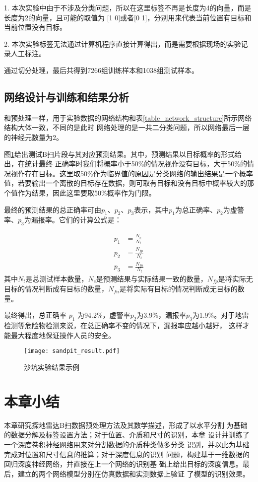 1. 本次实验中由于不涉及分类问题，所以在这里标签不再是长度为4的向量，而是长度为2的向量，且可能的取值为
[1 0]或者[0 1]，分别用来代表当前位置有目标和当前位置没有目标。

2. 本次实验标签无法通过计算机程序直接计算得出，而是需要根据现场的实验记录人工标注。

通过切分处理，最后共得到7266组训练样本和1038组测试样本。
\subsection{网络设计与训练和结果分析}
和预处理一样，用于实验数据的网络结构和表\ref{table_network_structure}所示网络结构大体一致，不同的是此时
网络处理的是一共二分类问题，所以网络最后一层的神经元数量为2。

图\ref{sandpit_result}给出测试B扫片段与其对应预测结果。其中，预测结果以目标概率的形式给出，在统计最终
正确率时我们将概率小于50\%的情况视作没有目标，大于50\%的情况视作存在目标。这里取50\%作为临界值的原因是分类网络的输出结果是一个概率值，若要输出一个离散的目标存在数据，则可取有目标和没有目标中概率较大的那个值作为结果，因此这里要取50\%概率作为门限。

最终的预测结果的总正确率可由$p_1$、$p_2$、$p_3$表示，其中$p_1$为总正确率、$p_2$为虚警率、$p_3$为漏报率。它们的计算公式是：

\begin{equation}
	\begin{aligned}
		p_1 &= \frac{N_c}{N_t} \\
		p_2 &= \frac{N_{fp}}{N_t} \\
		p_3 &= \frac{N_{fn}}{N_t}
	\end{aligned}
\end{equation}
其中$N_t$是总测试样本数量，$N_c$是预测结果与实际结果一致的数量，$N_{fp}$是将实际无目标的情况判断成有目标的数量，$N_{fn}$是将实际有目标的情况判断成无目标的数量。

最终得出，总正确率 $p_1$ 为94.2\%，虚警率$p_2$为3.9\%，漏报率$p_3$为1.9\%。对于地雷检测等危险物检测来说，在总正确率不变的情况下，漏报率应越小越好，
这样才能最大程度地保证操作人员的安全。
\begin{figure}[htbp]
	\texttt{[image: sandpit\_result.pdf]}
	\caption[]{沙坑实验结果示例}
	\label{sandpit_result}
\end{figure}

\section{本章小结}
本章研究探地雷达B扫数据预处理方法及其数学描述，形成了以水平分割
为基础的数据分解及标签设置方法；对于位置、介质和尺寸的识别，本章
设计并训练了一个深度卷积神经网络用来对分割数据的介质种类做多分类
识别，并以此为基础完成对位置和尺寸信息的推算；对于深度信息的识别
问题，构建基于一维数据的回归深度神经网络，并直接在上一个网络的识别基
础上给出目标的深度信息。最后，建立的两个网络模型分别在仿真数据和实测数据上验证
了模型的识别效果。